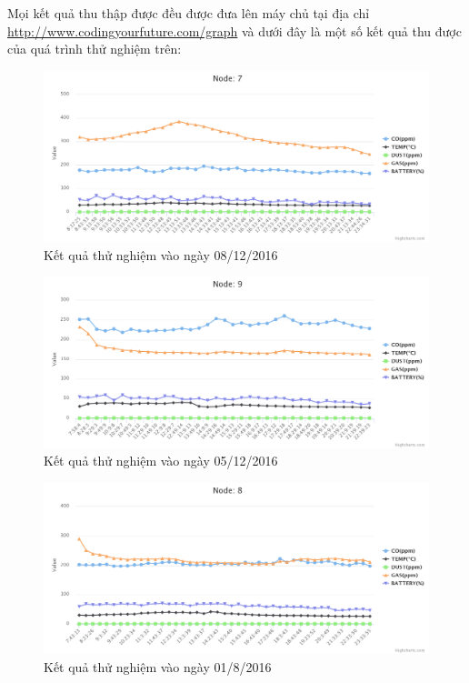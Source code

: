 Mọi kết quả thu thập được đều được đưa lên máy chủ tại địa chỉ \url{http://www.codingyourfuture.com/graph}
 và dưới đây là một số kết quả thu được của quá trình thử nghiệm trên:

\begin{figure}[H]
	\centering    
	\includegraphics[width=6in]{08dec}
	\caption[Kết quả thử nghiệm vào ngày 08/12/2016]{Kết quả thử nghiệm vào ngày 08/12/2016}
	\label{fig:08dec}
\end{figure}

\begin{figure}[H]
	\centering    
	\includegraphics[width=6in]{05dec_9}
	\caption[Kết quả thử nghiệm vào ngày 05/12/2016]{Kết quả thử nghiệm vào ngày 05/12/2016}
	\label{fig:05dec_9}
\end{figure}


\begin{figure}[H]
	\centering    
	\includegraphics[width=6in]{01dec_8}
	\caption[Kết quả thử nghiệm vào ngày 01/8/2016]{Kết quả thử nghiệm vào ngày 01/8/2016}
	\label{fig:01dec_8}
\end{figure}


